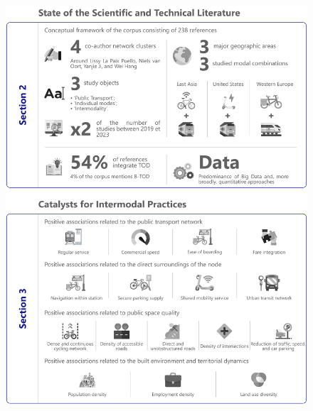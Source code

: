 \begin{refsegment}
\begin{figure}[h!]\vspace*{4pt}
        \caption*{}
        \label{graphical-abstract-chap2}
        \centerline{\includegraphics[width=1\columnwidth]{src/Figures/Graphical-abstract/EN_Graphical_abstract_chap2.pdf}}
        \vspace{5pt}
    \end{figure}


\end{refsegment}
